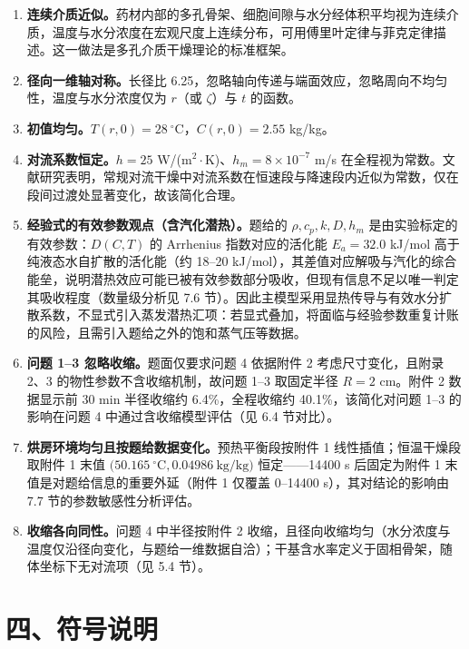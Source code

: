 \documentclass[12pt,a4paper]{ctexart}
\begin{document}
\begin{enumerate}[label=H\arabic*.,leftmargin=2.2em]
\item \textbf{连续介质近似。}药材内部的多孔骨架、细胞间隙与水分经体积平均视为连续介质，温度与水分浓度在宏观尺度上连续分布，可用傅里叶定律与菲克定律描述。这一做法是多孔介质干燥理论的标准框架\cite{whitaker,mujumdar}。
\item \textbf{径向一维轴对称。}长径比 6.25，忽略轴向传递与端面效应，忽略周向不均匀性，温度与水分浓度仅为 $r$（或 $\zeta$）与 $t$ 的函数。
\item \textbf{初值均匀。}$T(r,0)=28\ ^\circ$C，$C(r,0)=2.55$ kg/kg。
\item \textbf{对流系数恒定。}$h=25$ W/(m$^2\!\cdot$K)、$h_m=8\times10^{-7}$ m/s 在全程视为常数。文献研究表明，常规对流干燥中对流系数在恒速段与降速段内近似为常数，仅在段间过渡处显著变化\cite{mujumdar,defraeye}，故该简化合理。
\item \textbf{经验式的有效参数观点（含汽化潜热）。}题给的 $\rho,c_p,k,D,h_m$ 是由实验标定的有效参数：$D(C,T)$ 的 Arrhenius 指数对应的活化能 $E_a=32.0$ kJ/mol 高于纯液态水自扩散的活化能（约 18--20 kJ/mol\cite{mills}），其差值对应解吸与汽化的综合能垒，说明潜热效应可能已被有效参数部分吸收，但现有信息不足以唯一判定其吸收程度（数量级分析见 7.6 节）。因此主模型采用显热传导与有效水分扩散系数，不显式引入蒸发潜热汇项：若显式叠加，将面临与经验参数重复计账的风险，且需引入题给之外的饱和蒸气压等数据。
\item \textbf{问题 1--3 忽略收缩。}题面仅要求问题 4 依据附件 2 考虑尺寸变化，且附录 2、3 的物性参数不含收缩机制，故问题 1--3 取固定半径 $R=2$ cm。附件 2 数据显示前 30 min 半径收缩约 6.4\%，全程收缩约 40.1\%，该简化对问题 1--3 的影响在问题 4 中通过含收缩模型评估（见 6.4 节对比）。
\item \textbf{烘房环境均匀且按题给数据变化。}预热平衡段按附件 1 线性插值；恒温干燥段取附件 1 末值 $(50.165\ ^\circ$C$, 0.04986\ \mathrm{kg/kg})$ 恒定——14400 s 后固定为附件 1 末值是对题给信息的重要外延（附件 1 仅覆盖 0--14400 s），其对结论的影响由 7.7 节的参数敏感性分析评估。
\item \textbf{收缩各向同性。}问题 4 中半径按附件 2 收缩，且径向收缩均匀（水分浓度与温度仅沿径向变化，与题给一维数据自洽）；干基含水率定义于固相骨架，随体坐标下无对流项（见 5.4 节）。
\end{enumerate}

\section{四、符号说明}
\end{document}
